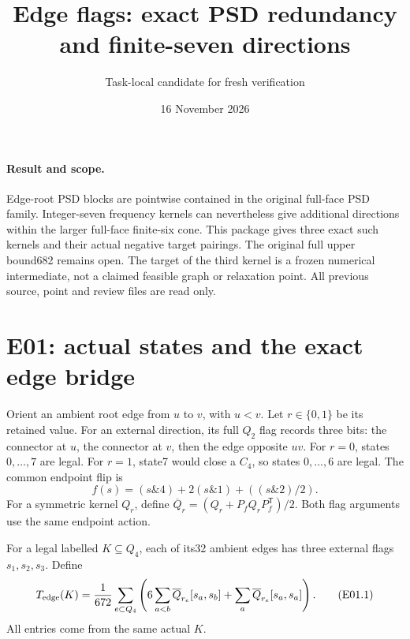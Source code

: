 \documentclass[11pt]{article}
\title{Edge flags: exact PSD redundancy and finite-seven directions}
\author{Task-local candidate for fresh verification}
\date{16 November 2026}
\begin{document}
\maketitle

\paragraph{Result and scope.}
Edge-root PSD blocks are pointwise contained in the original full-face
PSD family.  Integer-seven frequency kernels can nevertheless give
additional directions within the larger full-face finite-six cone.
This package gives three exact such kernels and their actual negative
target pairings.  The original full upper bound682 remains open.
The target of the third kernel is a frozen numerical intermediate,
not a claimed feasible graph or relaxation point.  All previous source,
point and review files are read only.

\section{E01: actual states and the exact edge bridge}

Orient an ambient root edge from \(u\) to \(v\), with \(u<v\).
Let \(r\in\{0,1\}\) be its retained value.  For an external direction,
its full \(Q_2\) flag records three bits: the connector at \(u\), the
connector at \(v\), then the edge opposite \(uv\).
For \(r=0\), states \(0,\ldots,7\) are legal.  For \(r=1\), state7
would close a \(C_4\), so states \(0,\ldots,6\) are legal.
The common endpoint flip is
\[
 f(s)=(s\mathbin{\&}4)+2(s\mathbin{\&}1)
                  +((s\mathbin{\&}2)/2).
\]
For a symmetric kernel \(Q_r\), define
\(\overline Q_r=(Q_r+P_fQ_rP_f^{\mathsf T})/2\).
Both flag arguments use the same endpoint action.

For a legal labelled \(K\subseteq Q_4\), each of its32 ambient edges
has three external flags \(s_1,s_2,s_3\).  Define
\[
 T_{\rm edge}(K)=\frac1{672}\sum_{e\subset Q_4}
 \left(6\sum_{a<b}\overline Q_{r_e}[s_a,s_b]
              +\sum_a\overline Q_{r_e}[s_a,s_a]\right).
 \tag{E01.1}
\]
All entries come from the same actual \(K\).
\end{document}
